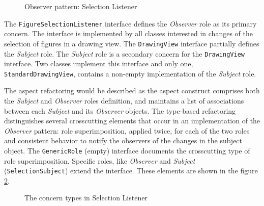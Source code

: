 \begin{figure}[h]
	\centering
  	\caption{Observer pattern: Selection Listener \cite{marin2005approach}}
  	\label{fig:Selection_Listener}
\end{figure}

The \texttt{FigureSelectionListener} interface defines the \textit{Observer} role as its primary concern. 
The interface is implemented by all classes interested in changes of the selection of figures in a drawing view. 
The \texttt{DrawingView} interface partially defines the \textit{Subject} role. 
The \textit{Subject} role is a secondary concern for the \texttt{DrawingView} interface. 
Two classes implement this interface and only one, \texttt{StandardDrawingView}, contains a non-empty implementation of the \textit{Subject} role.

The aspect refactoring would be described as the aspect construct comprises both the \textit{Subject} and \textit{Observer} roles definition, and maintains a list of associations between each \textit{Subject} and its \textit{Observer} objects.
The type-based refactoring\cite{marin2005approach} distinguishes several crosscutting elements that occur in an implementation of the \textit{Observer} pattern: role superimposition, applied twice, for each of the two roles and consistent behavior to notify the observers of the changes in the subject object. 
The \texttt{GenericRole} (empty) interface documents the crosscutting type of role superimposition. 
Specific roles, like \textit{Observer} and \textit{Subject} (\texttt{SelectionSubject}) extend the interface.
These elements are shown in the figure \ref{fig:Concerns_Selection_Listener}.

\begin{figure}[h]
	\centering
  	\caption{The concern types in Selection Listener \cite{marin2005approach}}
  	\label{fig:Concerns_Selection_Listener}
\end{figure}


